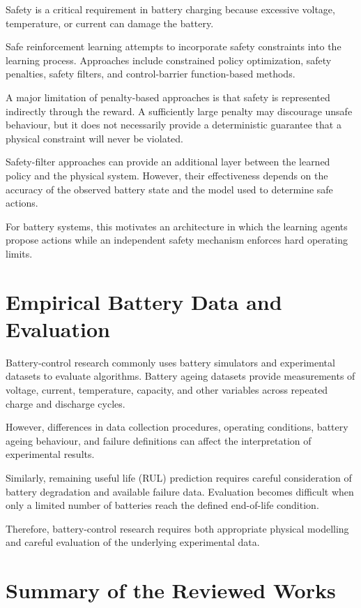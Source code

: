 Safety is a critical requirement in battery charging because excessive
voltage, temperature, or current can damage the battery.

Safe reinforcement learning attempts to incorporate safety constraints
into the learning process. Approaches include constrained policy
optimization, safety penalties, safety filters, and control-barrier
function-based methods.

A major limitation of penalty-based approaches is that safety is
represented indirectly through the reward. A sufficiently large
penalty may discourage unsafe behaviour, but it does not necessarily
provide a deterministic guarantee that a physical constraint will
never be violated.

Safety-filter approaches can provide an additional layer between the
learned policy and the physical system. However, their effectiveness
depends on the accuracy of the observed battery state and the model
used to determine safe actions.

For battery systems, this motivates an architecture in which the
learning agents propose actions while an independent safety mechanism
enforces hard operating limits.

\section{Empirical Battery Data and Evaluation}

Battery-control research commonly uses battery simulators and
experimental datasets to evaluate algorithms. Battery ageing datasets
provide measurements of voltage, current, temperature, capacity, and
other variables across repeated charge and discharge cycles.

However, differences in data collection procedures, operating
conditions, battery ageing behaviour, and failure definitions can
affect the interpretation of experimental results.

Similarly, remaining useful life (RUL) prediction requires careful
consideration of battery degradation and available failure data.
Evaluation becomes difficult when only a limited number of batteries
reach the defined end-of-life condition.

Therefore, battery-control research requires both appropriate physical
modelling and careful evaluation of the underlying experimental data.

\section{Summary of the Reviewed Works}

